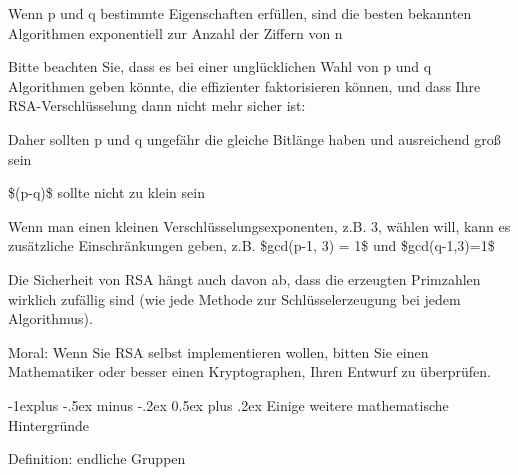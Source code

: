 \documentclass[a4paper]{article}
\makeatletter
\renewcommand{\subsection}{\@startsection{subsection}{2}{0mm}%
 {-1explus -.5ex minus -.2ex}%
 {0.5ex plus .2ex}%
 {\normalfont\normalsize\bfseries}}
\makeatother
\begin{document}
\begin{multicols}{3}
\begin{itemize*}
            \begin{itemize*}
                  \item Wenn p und q bestimmte Eigenschaften erfüllen, sind die besten bekannten Algorithmen exponentiell zur Anzahl der Ziffern von n
                  \item Bitte beachten Sie, dass es bei einer unglücklichen Wahl von p und q Algorithmen geben könnte, die effizienter faktorisieren können, und dass Ihre RSA-Verschlüsselung dann nicht mehr sicher ist:
                  \begin{itemize*} \item Daher sollten p und q ungefähr die gleiche Bitlänge haben und ausreichend groß sein \item \$(p-q)\$ sollte nicht zu klein sein \item Wenn man einen kleinen Verschlüsselungsexponenten, z.B. 3, wählen will, kann es zusätzliche Einschränkungen geben, z.B. \$gcd(p-1, 3) = 1\$ und \$gcd(q-1,3)=1\$ \end{itemize*}
                  \item Die Sicherheit von RSA hängt auch davon ab, dass die erzeugten Primzahlen wirklich zufällig sind (wie jede Methode zur Schlüsselerzeugung bei jedem Algorithmus).
                  \item Moral: Wenn Sie RSA selbst implementieren wollen, bitten Sie einen Mathematiker oder besser einen Kryptographen, Ihren Entwurf zu überprüfen.
            \end{itemize*}
      \end{itemize*}


      \subsection{Einige weitere mathematische
            Hintergründe}

      \begin{itemize*}
            \item
            Definition: endliche Gruppen


\end{itemize*}
\end{multicols}
\end{document}
